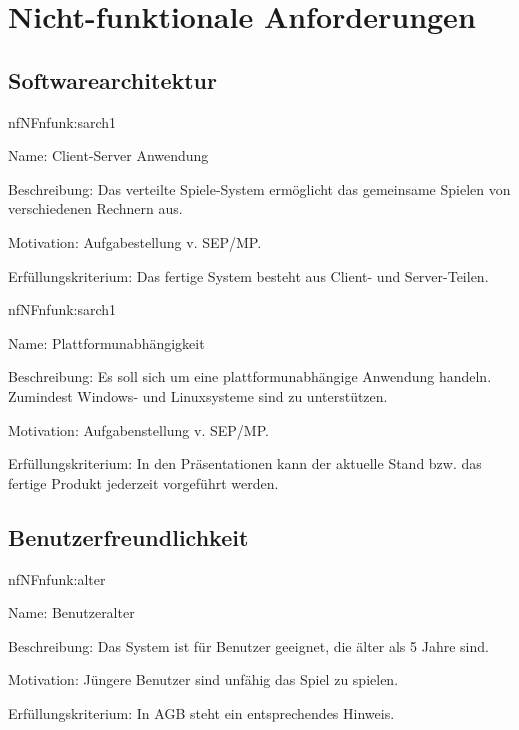 \chapter{Nicht-funktionale Anforderungen}

\setcounter{nf}{10}

\section{Softwarearchitektur}

\begin{description}[leftmargin=5em, style=sameline]	
	\begin{lhp}{nf}{NF}{nfunk:sarch1}
		\item [Name:] Client-Server Anwendung
		\item [Beschreibung:] Das verteilte Spiele-System ermöglicht das gemeinsame Spielen von verschiedenen Rechnern aus.
		\item [Motivation:] Aufgabestellung v. SEP/MP.
		\item [Erfüllungskriterium:] Das fertige System besteht aus Client- und Server-Teilen.
	\end{lhp}
	
	\begin{lhp}{nf}{NF}{nfunk:sarch1}
		\item [Name:] Plattformunabhängigkeit
		\item [Beschreibung:] Es soll sich um eine plattformunabhängige Anwendung handeln. Zumindest Windows- und Linuxsysteme sind zu unterstützen.
		\item [Motivation:] Aufgabenstellung v. SEP/MP.
		\item [Erfüllungskriterium:]In den Präsentationen kann der aktuelle Stand bzw. das fertige Produkt jederzeit vorgeführt werden.
	\end{lhp}
\end{description}



\section{Benutzerfreundlichkeit}


\begin{description}[leftmargin=5em, style=sameline]	
	\begin{lhp}{nf}{NF}{nfunk:alter}
		\item [Name:] Benutzeralter
		\item [Beschreibung:] Das System ist für Benutzer geeignet, die älter als 5 Jahre sind.
		\item [Motivation:] Jüngere Benutzer sind unfähig das Spiel zu spielen.
		\item [Erfüllungskriterium:] In AGB steht ein entsprechendes Hinweis.
	\end{lhp}
\end{description}

